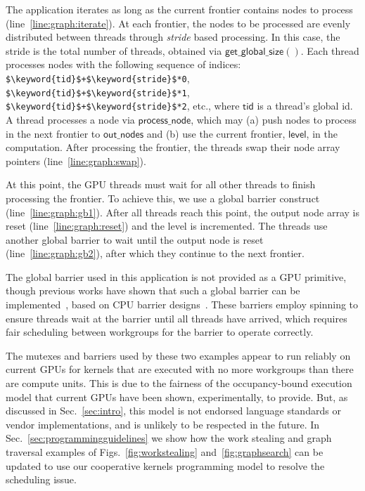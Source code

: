 \documentclass[numbers,nocopyrightspace,10pt]{sigplanconf}
\newcommand{\myfigs}{Figs.~}
\newcommand{\mysec}{Sec.~}
\newcommand{\code}[1]{\lstset{basicstyle=\tt}\lstinline!#1!\lstset{basicstyle=\scriptsize\tt}}
\newcommand{\getglobalsize}{\mathsf{get\_global\_size}}
\newcommand{\keyword}[1]{\mathsf{#1}}
\begin{document}
The application iterates as long as the current frontier contains
nodes to process (line~\ref{line:graph:iterate}). At each frontier,
the nodes to be processed are evenly distributed between
threads through \emph{stride} based processing. 
%
In this case, the stride is the total number of threads, obtained via 
$\getglobalsize()$.  Each thread processes nodes with the following sequence of indices:
\code{$\keyword{tid}$+$\keyword{stride}$*0},
\code{$\keyword{tid}$+$\keyword{stride}$*1},
\code{$\keyword{tid}$+$\keyword{stride}$*2}, etc., where $\keyword{tid}$ is a thread's global id.
A thread processes a node via $\keyword{process\_node}$, which may (a) push nodes to process in the next frontier to
$\keyword{out\_nodes}$ and (b) use the current frontier, $\keyword{level}$, in
the computation. After processing the frontier, the threads swap their
node array pointers (line~\ref{line:graph:swap}).

At this point, the GPU threads must wait for all other threads to
finish processing the frontier. To achieve
this, we use a global barrier construct
(line~\ref{line:graph:gb1}). After all threads reach this point, the
output node array is reset (line~\ref{line:graph:reset}) and the level
is incremented. The threads use another global barrier to wait until the output node is
reset (line~\ref{line:graph:gb2}), after which they continue to the next frontier.

The global barrier used in this application is not provided as a GPU
primitive, though previous works have shown that such a global
barrier can be implemented~\cite{XF10,DBLP:conf/oopsla/SorensenDBGR16},
based on CPU barrier designs~\cite[ch. 17]{HS08}.
 These barriers employ spinning to ensure threads wait at the barrier until all
threads have arrived, which requires fair
scheduling between workgroups for the barrier to operate correctly.

The mutexes and barriers used by these two examples appear to run
reliably on current GPUs for kernels that are executed with no more
workgroups than there are compute units.  This is due to the fairness
of the occupancy-bound execution model that current GPUs have been
shown, experimentally, to provide.  But, as discussed in
\mysec\ref{sec:intro}, this model is not endorsed
language standards or vendor implementations, and is unlikely to be respected in the future.
%
In \mysec\ref{sec:programmingguidelines} we show how the work stealing
and graph traversal examples of \myfigs\ref{fig:workstealing} and~\ref{fig:graphsearch} can be
updated to use our cooperative kernels programming model to resolve
the scheduling issue.
\end{document}
